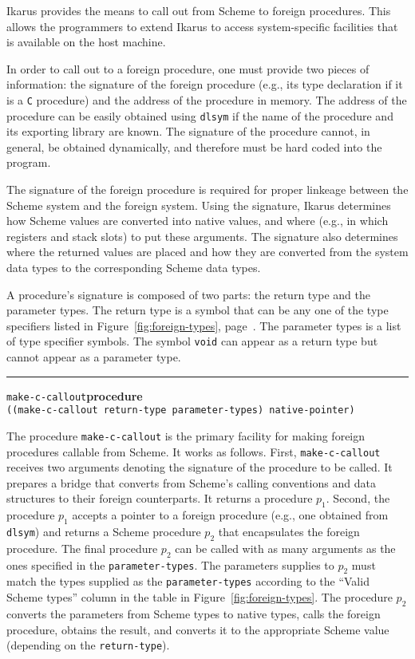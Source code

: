 \documentclass[onecolumn, 12pt, twoside, openright, dvipdfm]{book}
\makeatletter
\newcommand{\idxlabeldefun}[5]{
\vspace{1ex}
\rule{\textwidth}{2pt}
{\phantomsection\index{#1@\texttt{#2}}\label{#3}{\Large\texttt{#4}}\hfill\textbf{#5}}\\}
\newcommand{\idxdefun}[3]{\idxlabeldefun{#1}{#2}{#1}{#2}{#3}}
\newcommand{\defun}[2]{\idxdefun{#1}{#1}{#2}}
\makeatother
\begin{document}
Ikarus provides the means to call out from Scheme to foreign
procedures.  This allows the programmers to extend Ikarus to access
system-specific facilities that is available on the host machine.  

In order to call out to a foreign procedure, one must provide two
pieces of information: the signature of the foreign procedure (e.g.,
its type declaration if it is a \texttt{C} procedure) and the
address of the procedure in memory.  The address of the procedure
can be easily obtained using \texttt{dlsym} if the name of the
procedure and its exporting library are known.  The signature of the
procedure cannot, in general, be obtained dynamically, and therefore
must be hard coded into the program.

The signature of the foreign procedure is required for proper
linkeage between the Scheme system and the foreign system.  Using
the signature, Ikarus determines how Scheme values are converted
into native values, and where (e.g., in which registers and stack
slots) to put these arguments.  The signature also determines where
the returned values are placed and how they are converted from the
system data types to the corresponding Scheme data types.

A procedure's signature is composed of two parts: the return type
and the parameter types.  The return type is a symbol that can be
any one of the type specifiers listed in
Figure~\ref{fig:foreign-types}, page~\pageref{fig:foreign-types}.
The parameter types is a list of type specifier symbols.  The symbol
\texttt{void} can appear as a return type but cannot appear as a
parameter type.



\defun{make-c-callout}{procedure}
\texttt{((make-c-callout return-type parameter-types) native-pointer)}

The procedure \texttt{make-c-callout} is the primary facility for
making foreign procedures callable from Scheme.  It works as
follows.  First, \texttt{make-c-callout} receives two arguments
denoting the signature of the procedure to be called.  It prepares a
bridge that converts from Scheme's calling conventions and data
structures to their foreign counterparts.  It returns a procedure
$p_1$.  Second, the procedure $p_1$ accepts a pointer to a foreign
procedure (e.g., one obtained from \texttt{dlsym}) and returns a
Scheme procedure $p_2$ that encapsulates the foreign procedure.  The
final procedure $p_2$ can be called with as many arguments as the
ones specified in the \texttt{parameter-types}.  The parameters
supplies to $p_2$ must match the types supplied as the
\texttt{parameter-types} according to the ``Valid Scheme types''
column in the table in Figure~\ref{fig:foreign-types}.  The
procedure $p_2$ converts the parameters from Scheme types to native
types, calls the foreign procedure, obtains the result, and converts
it to the appropriate Scheme value (depending on the
\texttt{return-type}).
\end{document}
